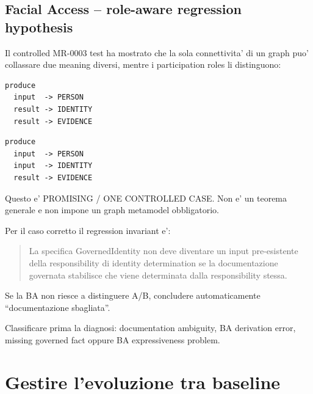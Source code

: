 \documentclass[11pt,a4paper]{article}
\begin{document}
\subsection{Facial Access -- role-aware regression hypothesis}

Il controlled MR-0003 test ha mostrato che la sola connettivita' di un graph puo' collassare due meaning diversi, mentre i participation roles li distinguono:

\begin{examplebox}
\begin{lstlisting}
produce
  input  -> PERSON
  result -> IDENTITY
  result -> EVIDENCE
\end{lstlisting}
\end{examplebox}

\begin{examplebox}
\begin{lstlisting}
produce
  input  -> PERSON
  input  -> IDENTITY
  result -> EVIDENCE
\end{lstlisting}
\end{examplebox}

\begin{statusworking}
Questo e' PROMISING / ONE CONTROLLED CASE. Non e' un teorema generale e non impone un graph metamodel obbligatorio.
\end{statusworking}

Per il caso corretto il regression invariant e':

\begin{quote}
La specifica GovernedIdentity non deve diventare un input pre-esistente della responsibility di identity determination se la documentazione governata stabilisce che viene determinata dalla responsibility stessa.
\end{quote}

\begin{badbox}
Se la BA non riesce a distinguere A/B, concludere automaticamente ``documentazione sbagliata''.
\end{badbox}

\begin{goodbox}
Classificare prima la diagnosi: documentation ambiguity, BA derivation error, missing governed fact oppure BA expressiveness problem.
\end{goodbox}


\section{Gestire l'evoluzione tra baseline}
\end{document}
